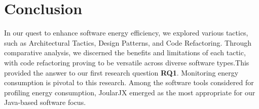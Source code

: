\section{Conclusion}
 In our quest to enhance software energy efficiency, we explored various tactics, such as Architectural Tactics, Design Patterns, and Code Refactoring. Through comparative analysis, we discerned the benefits and limitations of each tactic, with code refactoring proving to be versatile across diverse software types.This provided the answer to our first research question \textbf{RQ1}. Monitoring energy consumption is pivotal to this research. Among the software tools considered for profiling energy consumption, JoularJX emerged as the most appropriate for our Java-based software focus. 